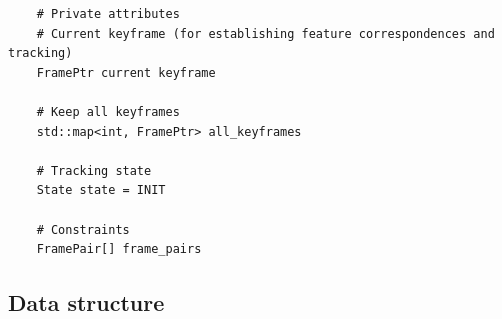 \begin{itemize}
\begin{verbatim}
    # Private attributes
    # Current keyframe (for establishing feature correspondences and tracking)
    FramePtr current keyframe
    
    # Keep all keyframes
    std::map<int, FramePtr> all_keyframes
    
    # Tracking state
    State state = INIT

    # Constraints
    FramePair[] frame_pairs

  \end{verbatim}
  
\end{itemize}

\subsection{Data structure}


